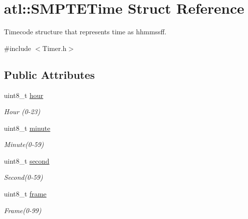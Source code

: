 \hypertarget{structatl_1_1SMPTETime}{}\section{atl\+:\+:S\+M\+P\+T\+E\+Time Struct Reference}
\label{structatl_1_1SMPTETime}


Timecode structure that represents time as hhmmssff.  




{\ttfamily \#include $<$Timer.\+h$>$}

\subsection*{Public Attributes}
\begin{DoxyCompactItemize}
\item 
uint8\+\_\+t \hyperlink{structatl_1_1SMPTETime_ae9bc7c59676bec8072d7cefc11e11bcd}{hour}\hypertarget{structatl_1_1SMPTETime_ae9bc7c59676bec8072d7cefc11e11bcd}{}\label{structatl_1_1SMPTETime_ae9bc7c59676bec8072d7cefc11e11bcd}

\begin{DoxyCompactList}\small\item\em Hour (0-\/23) \end{DoxyCompactList}\item 
uint8\+\_\+t \hyperlink{structatl_1_1SMPTETime_abab7e2c62c85fb0292c2a858bca17cd6}{minute}\hypertarget{structatl_1_1SMPTETime_abab7e2c62c85fb0292c2a858bca17cd6}{}\label{structatl_1_1SMPTETime_abab7e2c62c85fb0292c2a858bca17cd6}

\begin{DoxyCompactList}\small\item\em Minute(0-\/59) \end{DoxyCompactList}\item 
uint8\+\_\+t \hyperlink{structatl_1_1SMPTETime_a62ab506e2f0a050e7ceb5efd9860452e}{second}\hypertarget{structatl_1_1SMPTETime_a62ab506e2f0a050e7ceb5efd9860452e}{}\label{structatl_1_1SMPTETime_a62ab506e2f0a050e7ceb5efd9860452e}

\begin{DoxyCompactList}\small\item\em Second(0-\/59) \end{DoxyCompactList}\item 
uint8\+\_\+t \hyperlink{structatl_1_1SMPTETime_a6f7c94d853149375f3898de0f59d484c}{frame}\hypertarget{structatl_1_1SMPTETime_a6f7c94d853149375f3898de0f59d484c}{}\label{structatl_1_1SMPTETime_a6f7c94d853149375f3898de0f59d484c}

\begin{DoxyCompactList}\small\item\em Frame(0-\/99) \end{DoxyCompactList}\end{DoxyCompactItemize}


